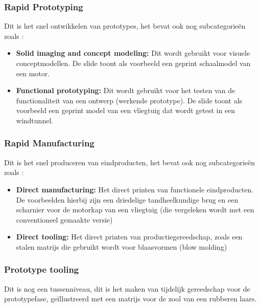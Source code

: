 \subsubsection{Rapid Prototyping}
Dit is het snel ontwikkelen van prototypes, het bevat ook nog subcategorieën zoals :
\begin{itemize}
   \item \textbf{Solid imaging and concept modeling: }Dit wordt gebruikt voor visuele conceptmodellen. De slide toont als voorbeeld een geprint schaalmodel van een motor.
   \item \textbf{Functional prototyping: }Dit wordt gebruikt voor het testen van de functionaliteit van een ontwerp (werkende prototype). De slide toont als voorbeeld een geprint model van een vliegtuig dat wordt getest in een windtunnel.
\end{itemize}
\subsubsection{Rapid Manufacturing}
Dit is het snel produceren van eindproducten, het bevat ook nog subcategorieën zoals :
\begin{itemize}
    \item \textbf{Direct manufacturing: }Het direct printen van functionele eindproducten. De voorbeelden hierbij zijn een driedelige tandheelkundige brug en een scharnier voor de motorkap van een vliegtuig (die vergeleken wordt met een conventioneel gemaakte versie)
    \item \textbf{Direct tooling:} Het direct printen van productiegereedschap, zoals een stalen matrijs die gebruikt wordt voor blaasvormen (blow molding)
\end{itemize}
\subsubsection{Prototype tooling}
Dit is nog een tussenniveau, dit is het maken van tijdelijk gereedschap voor de prototypefase, geïllustreerd met een matrijs voor de zool van een rubberen laars.
